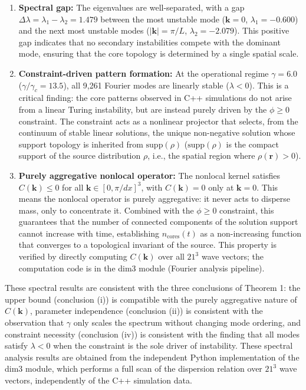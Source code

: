 \documentclass[sn-nature,pdflatex]{sn-jnl}
\begin{document}
\begin{enumerate}
  \item \textbf{Spectral gap:} The eigenvalues are well-separated, with a gap $\Delta\lambda = \lambda_1 - \lambda_2 = 1.479$ between the most unstable mode ($\mathbf{k}=0$, $\lambda_1 = -0.600$) and the next most unstable modes ($|\mathbf{k}| = \pi/L$, $\lambda_2 = -2.079$). This positive gap indicates that no secondary instabilities compete with the dominant mode, ensuring that the core topology is determined by a single spatial scale.

  \item \textbf{Constraint-driven pattern formation:} At the operational regime $\gamma = 6.0$ ($\gamma/\gamma_c = 13.5$), all 9,261 Fourier modes are linearly stable ($\lambda < 0$). This is a critical finding: the core patterns observed in C++ simulations do not arise from a linear Turing instability, but are instead purely driven by the $\phi \ge 0$ constraint. The constraint acts as a nonlinear projector that selects, from the continuum of stable linear solutions, the unique non-negative solution whose support topology is inherited from $\text{supp}(\rho)$ ($\text{supp}(\rho)$ is the compact support of the source distribution $\rho$, i.e., the spatial region where $\rho(\mathbf{r}) > 0$).

  \item \textbf{Purely aggregative nonlocal operator:} The nonlocal kernel satisfies $C(\mathbf{k}) \le 0$ for all $\mathbf{k} \in [0, \pi/dx]^3$, with $C(\mathbf{k}) = 0$ only at $\mathbf{k} = 0$. This means the nonlocal operator is purely aggregative: it never acts to disperse mass, only to concentrate it. Combined with the $\phi \ge 0$ constraint, this guarantees that the number of connected components of the solution support cannot increase with time, establishing $n_{\text{cores}}(t)$ as a non-increasing function that converges to a topological invariant of the source. This property is verified by directly computing $C(\mathbf{k})$ over all $21^3$ wave vectors; the computation code is in the dim3 module (Fourier analysis pipeline).
\end{enumerate}

These spectral results are consistent with the three conclusions of Theorem 1: the upper bound (conclusion (i)) is compatible with the purely aggregative nature of $C(\mathbf{k})$, parameter independence (conclusion (ii)) is consistent with the observation that $\gamma$ only scales the spectrum without changing mode ordering, and constraint necessity (conclusion (iv)) is consistent with the finding that all modes satisfy $\lambda < 0$ when the constraint is the sole driver of instability. These spectral analysis results are obtained from the independent Python implementation of the dim3 module, which performs a full scan of the dispersion relation over $21^3$ wave vectors, independently of the C++ simulation data.
\end{document}
